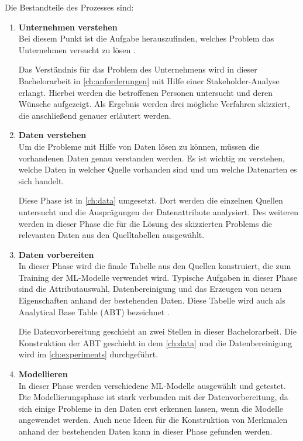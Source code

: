Die Bestandteile des Prozesses sind: \\
\begin{enumerate}
 \item \textbf{Unternehmen verstehen} \\
 Bei diesem Punkt ist die Aufgabe herauszufinden, welches Problem das Unternehmen versucht zu lösen \cite{d.kelleher2015crispdm}.
 
 Das Verständnis für das Problem des Unternehmens wird in dieser Bachelorarbeit in \autoref{ch:anforderungen} mit Hilfe einer Stakeholder-Analyse erlangt. Hierbei werden die betroffenen Personen untersucht und deren Wünsche aufgezeigt. Als Ergebnis werden drei mögliche Verfahren skizziert, die anschließend genauer erläutert werden.  
 
 \item \textbf{Daten verstehen} \\
 Um die Probleme mit Hilfe von Daten lösen zu können, müssen die vorhandenen Daten genau verstanden werden. Es ist wichtig zu verstehen, welche Daten in welcher Quelle vorhanden sind und um welche Datenarten es sich handelt. \cite{d.kelleher2015crispdm} 
 
 Diese Phase ist in \autoref{ch:data} umgesetzt. Dort werden die einzelnen Quellen untersucht und die Ausprägungen der Datenattribute analysiert. Des weiteren werden in dieser Phase die für die Lösung des skizzierten Problems die relevanten Daten aus den Quelltabellen ausgewählt. 
 
 \item \textbf{Daten vorbereiten} \\
 In dieser Phase wird die finale Tabelle aus den Quellen konstruiert, die zum Training der ML-Modelle verwendet wird. Typische Aufgaben in dieser Phase sind die Attributauswahl, Datenbereinigung und das Erzeugen von neuen Eigenschaften anhand der bestehenden Daten. \cite{wirth2000} Diese Tabelle wird auch als Analytical Base Table (ABT) bezeichnet \cite{d.kelleher2015crispdm}.
 
 Die Datenvorbereitung geschieht an zwei Stellen in dieser Bachelorarbeit. 
 Die Konstruktion der ABT geschieht in dem \autoref{ch:data} und die Datenbereinigung wird im \autoref{ch:experiments} durchgeführt. %
 
 \item \textbf{Modellieren} \\
 In dieser Phase werden verschiedene ML-Modelle ausgewählt und getestet.
 Die Modellierungsphase ist stark verbunden mit der Datenvorbereitung, da sich einige Probleme in den Daten erst erkennen lassen, wenn die Modelle angewendet werden. 
 Auch neue Ideen für die Konstruktion von Merkmalen anhand der bestehenden Daten kann in dieser Phase gefunden werden. \cite{wirth2000}
 

\end{enumerate}
